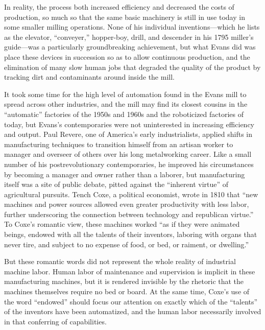 In reality, the process both increased efficiency and decreased the costs
of production, so much so that the same basic machinery is still in
use today in some smaller milling operations.\cite{wyegrist} None of his individual
inventions---which he lists as the elevator, ``conveyer,'' hopper-boy,
drill, and descender in his 1795 miller's guide---was a particularly
groundbreaking achievement, but what Evans did was place these devices
in succession so as to allow continuous production, and the
elimination of many slow human jobs that degraded the quality of the
product by tracking dirt and contaminants around inside the
mill.\cite[p. 203]{evansMillguide} 

It took some time for the high level of automation found in the Evans
mill to spread across other industries, and the mill may find its
closest cousins in the ``automatic'' factories of the 1950s and 1960s
and the roboticized factories of today, but Evans's contemporaries
were not uninterested in increasing efficiency and output. Paul
Revere, one of America's early industrialists, applied shifts in
manufacturing techniques to transition himself from an
artisan worker to manager and overseer of others over his long
metalworking career.\cite[p. 187]{martello} Like a small number of his postrevolutionary
contemporaries, he improved his circumstances by becoming a manager
and owner rather than a laborer, but manufacturing itself was a site of public
debate, pitted against the ``inherent virtue'' of agricultural pursuits.
Tench Coxe, a political economist, wrote in 1810 that ``new machines
and power sources allowed even greater productivity with less labor,
further underscoring the connection between technology and republican
virtue.''\cite[p. 217]{martello} To Coxe's romantic view, these machines  worked ``as if they
were animated beings, endowed with all the talents of their inventors,
laboring with organs that never tire, and subject to no expense of
food, or bed, or raiment, or dwelling.''\cite[p. xxv]{coxe}

But these romantic words did not represent the whole reality of
industrial machine labor. Human labor of
maintenance and supervision is implicit in these manufacturing
machines, but it is rendered invisible by the rhetoric that the
machines themselves require no bed or board. At the same time, Coxe's
use of the word ``endowed'' should focus our attention on exactly which
of the ``talents'' of the inventors have been automatized, and the human
labor necessarily involved in that conferring of capabilities. 

